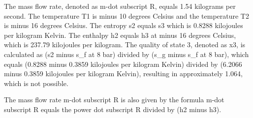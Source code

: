 The mass flow rate, denoted as m-dot subscript R, equals 1.54 kilograms per second. The temperature T1 is minus 10 degrees Celsius and the temperature T2 is minus 16 degrees Celsius. The entropy s2 equals s3 which is 0.8288 kilojoules per kilogram Kelvin. The enthalpy h2 equals h3 at minus 16 degrees Celsius, which is 237.79 kilojoules per kilogram. The quality of state 3, denoted as x3, is calculated as (s2 minus s_f at 8 bar) divided by (s_g minus s_f at 8 bar), which equals (0.8288 minus 0.3859 kilojoules per kilogram Kelvin) divided by (6.2066 minus 0.3859 kilojoules per kilogram Kelvin), resulting in approximately 1.064, which is not possible.

The mass flow rate m-dot subscript R is also given by the formula m-dot subscript R equals the power dot subscript R divided by (h2 minus h3).